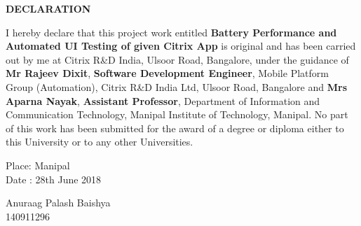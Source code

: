 \begin{center}
\large{\textbf{DECLARATION}}\\
\vspace{1cm}
\end{center}

\justify I hereby declare that this project work entitled \textbf{Battery Performance and Automated UI Testing of given Citrix App} is original and has been carried out by
me at Citrix R\&D India, Ulsoor Road, Bangalore, under the guidance of \textbf{Mr Rajeev Dixit}, \textbf{Software Development Engineer}, Mobile Platform Group (Automation), Citrix R\&D India Ltd, Ulsoor Road, Bangalore and \textbf{Mrs Aparna Nayak}, \textbf{Assistant Professor},  Department of Information and Communication Technology, Manipal Institute of Technology, Manipal. No part of this work has been submitted for the award of a degree or diploma either to this University or to any other Universities.



\vspace{2cm}

\begin{flushleft}
Place: Manipal\\
Date : 28th June 2018
\end{flushleft}


\begin{flushright}
Anuraag Palash Baishya\\
140911296
\end{flushright}